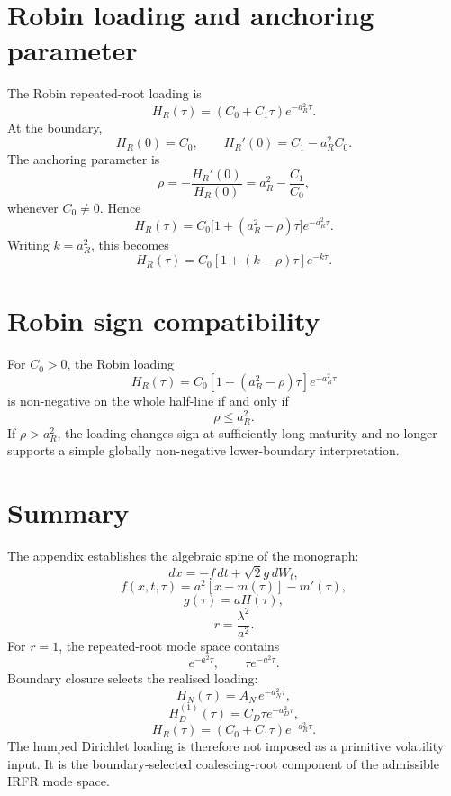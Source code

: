 \documentclass[11pt,oneside]{book}
\begin{document}
\section{Robin loading and anchoring parameter}
The Robin repeated-root loading is
\[
H_R(\tau)=(C_0+C_1\tau)e^{-a_R^2\tau}.
\]
At the boundary,
\[
H_R(0)=C_0,
\qquad
H_R'(0)=C_1-a_R^2C_0.
\]
The anchoring parameter is
\[
\rho=-\frac{H_R'(0)}{H_R(0)}
=a_R^2-\frac{C_1}{C_0},
\]
whenever \(C_0\neq0\). Hence
\[
H_R(\tau)=C_0\bigl[1+(a_R^2-\rho)\tau\bigr]e^{-a_R^2\tau}.
\]
Writing \(k=a_R^2\), this becomes
\[
H_R(\tau)=C_0[1+(k-\rho)\tau]e^{-k\tau}.
\]

\section{Robin sign compatibility}
For \(C_0>0\), the Robin loading
\[
H_R(\tau)=C_0[1+(a_R^2-\rho)\tau]e^{-a_R^2\tau}
\]
is non-negative on the whole half-line if and only if
\[
\rho\le a_R^2.
\]
If \(\rho>a_R^2\), the loading changes sign at sufficiently long maturity and no longer supports a simple globally non-negative lower-boundary interpretation.

\section{Summary}
The appendix establishes the algebraic spine of the monograph:
\[
dx=-f\,dt+\sqrt{2}g\,dW_t,
\]
\[
f(x,t,\tau)=a^2[x-m(\tau)]-m'(\tau),
\]
\[
g(\tau)=aH(\tau),
\]
\[
r=\frac{\lambda^2}{a^2}.
\]
For \(r=1\), the repeated-root mode space contains
\[
e^{-a^2\tau},
\qquad
\tau e^{-a^2\tau}.
\]
Boundary closure selects the realised loading:
\[
H_N(\tau)=A_N\,e^{-a_N^2\tau},
\]
\[
H_D^{(1)}(\tau)=C_D\tau e^{-a_D^2\tau},
\]
\[
H_R(\tau)=(C_0+C_1\tau)e^{-a_R^2\tau}.
\]
The humped Dirichlet loading is therefore not imposed as a primitive volatility input. It is the boundary-selected coalescing-root component of the admissible IRFR mode space.
\end{document}
